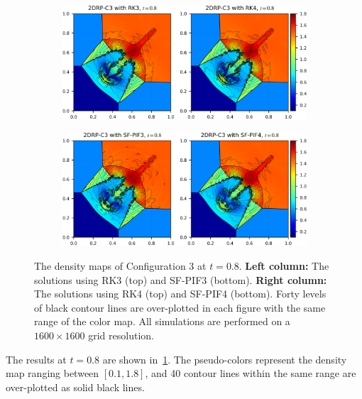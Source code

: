 \begin{figure}
    \centering
    \begin{subfigure}{\textwidth}
        \centering
        \includegraphics[width=\textwidth]{fig/2drp_c3_weno5_rk_1600.png}
    \end{subfigure}
    \begin{subfigure}{\textwidth}
        \centering
        \includegraphics[width=\textwidth]{fig/2drp_c3_weno5_sfPIF_1600.png}
    \end{subfigure}
    \caption{The density maps of Configuration 3 at \( t = 0.8 \).
        \textbf{Left column:} The solutions using RK3 (top) and SF-PIF3 (bottom).
        \textbf{Right column:} The solutions using RK4 (top) and SF-PIF4 (bottom).
        Forty levels of black contour lines are over-plotted in each figure
        with the same range of the color map.
        All simulations are performed on a \( 1600 \times 1600 \) grid resolution.
        }\label{fig:2drp_c3}
\end{figure}

The results at \( t = 0.8 \) are shown in~\cref{fig:2drp_c3}.
The pseudo-colors represent the density map ranging between \( [0.1, 1.8] \), and
40 contour lines within the same range are over-plotted as solid black lines.

